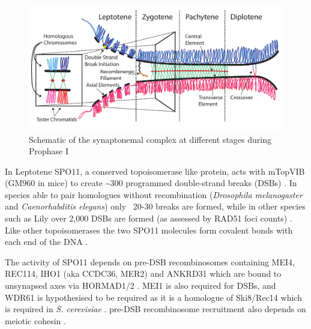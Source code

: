 \begin{figure}[H]
	\centering
	\includegraphics[width=\textwidth]{figures/intro/synaptonemal_complex.pdf}
	\caption[Synaptonemal Complex]{Schematic of the synaptonemal complex at different stages during Prophase I~\parencite[based on ][]{Gaysinskaya2018MOESM1, Gaysinskaya2018Transient, Cohen2010Predicting, Bolcun-Filas2012Chapter, Hughes2018Female, Cahoon2017Superresolution}}
	\label{fig:synaptonemal_complex}
\end{figure}

In Leptotene SPO11, a conserved topoisomerase like protein, acts with mTopVIB (GM960 in mice) to create \textasciitilde300 programmed double-strand breaks (DSBs) \parencite{Sun1989Doublestrand, Keeney1997MeiosisSpecific, Bergerat1997atypical, Cole2012Homeostatic, Vrielynck2016DNA, Robert2016TopoVIBLike, Li2019highresolution}.
In species able to pair homologues without recombination (\textit{Drosophila melanogaster} and \textit{Caenorhabditis elegans}) only ~20-30 breaks are formed, while in other species such as Lily over 2,000 DSBs are formed (as assessed by RAD51 foci counts) \parencite{Terasawa1995Localization}.
Like other topoisomerases the two SPO11 molecules form covalent bonds with each end of the DNA \parencite{Neale2005Endonucleolytic}.

The activity of SPO11 depends on pre-DSB recombinosomes containing MEI4, REC114, IHO1 (aka CCDC36, MER2) and ANKRD31 which are bound to unsynapsed axes via HORMAD1/2 \parencite{Kumar2010Functional,Panizza2011Spo11Accessory, Stanzione2016Meiotic, Kumar2018Mouse, Papanikos2019Mouse, Boekhout2019REC114}.
MEI1 is also required for DSBs, and WDR61 is hypothesised to be required as it is a homologue of Ski8/Rec14 which is required in \textit{S. cerevisiae} \parencite[reviewed in][]{Kumar2010Initiation, Lam2015Mechanism}.
pre-DSB recombinosome recruitment also depends on meiotic cohesin \parencite{Bhattacharyya2019Prdm9}.

